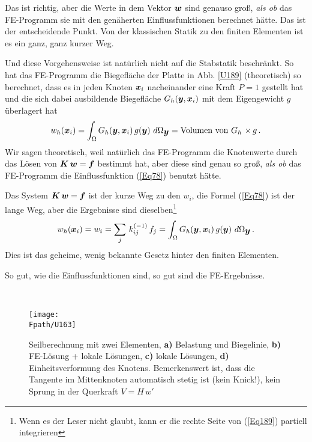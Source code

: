 Das ist richtig, aber die Werte in dem Vektor $\mbox{\boldmath $w$}$ sind genauso gro{\ss}, {\em als ob\/} das FE-Programm sie mit den gen\"{a}herten Einflussfunktionen berechnet h\"{a}tte. Das ist der entscheidende Punkt. Von der klassischen Statik zu den finiten Elementen ist es ein ganz, ganz kurzer Weg.

Und diese Vorgehensweise ist nat\"{u}rlich nicht auf die Stabstatik beschr\"{a}nkt. So hat das FE-Programm die Biegefl\"{a}che der Platte in Abb. \ref{U189} (theoretisch) so berechnet, dass es in jeden Knoten $\mbox{\boldmath $x$}_i$ nacheinander eine Kraft $P = 1$ gestellt hat und die sich dabei ausbildende Biegefl\"{a}che $G_h(\mbox{\boldmath $y$},\mbox{\boldmath $x$}_i)$ mit dem Eigengewicht $g$ \"{u}berlagert hat
\begin{align}\label{Eq78}
w_h(\mbox{\boldmath $x$}_i) = \int_{\Omega} G_h(\mbox{\boldmath $y$}, \mbox{\boldmath $x$}_i)\,g(\mbox{\boldmath $y$})\,\,d\Omega_{\mbox{\boldmath $y$}} = \text{Volumen von $G_h$ $\times\,g$}\,.
\end{align}
Wir sagen theoretisch, weil nat\"{u}rlich das FE-Programm die Knotenwerte durch das L\"{o}sen von $\mbox{\boldmath $K$}\,\mbox{\boldmath $w$} = \mbox{\boldmath $f$}$ bestimmt hat, aber diese sind  genau so gro{\ss}, {\em als ob\/} das FE-Programm die Einflussfunktion (\ref{Eq78}) benutzt h\"{a}tte.

Das System $\mbox{\boldmath $K$}\,\mbox{\boldmath $w$} = \mbox{\boldmath $f$}$ ist der \glq kurze\grq{} Weg zu den $w_i$, die Formel (\ref{Eq78}) ist der \glq lange\grq{} Weg, aber die Ergebnisse sind dieselben\footnote{Wenn es der Leser nicht glaubt, kann er die rechte Seite von (\ref{Eq189}) partiell integrieren}
\begin{align}\label{Eq189}
w_h(\mbox{\boldmath $x$}_i) = w_i = \sum_j\,k_{ij}^{(-1)}\,f_j = \int_{\Omega} G_h(\mbox{\boldmath $y$}, \mbox{\boldmath $x$}_i)\,g(\mbox{\boldmath $y$})\,\,d\Omega_{\mbox{\boldmath $y$}}\,.
\end{align}
Dies ist das geheime, wenig bekannte Gesetz hinter den finiten Elementen. \\

\hspace*{-12pt}\colorbox{highlightBlue}{\parbox{0.98\textwidth}{So gut, wie die Einflussfunktionen sind, so gut sind die FE-Ergebnisse.}}\\

\begin{figure}[tbp]
\centering
\if {} \sidecaption[t] \fi
\texttt{[image: \\Fpath/U163]}
\caption{Seilberechnung mit zwei Elementen,  \textbf{a)} Belastung und Biegelinie, \textbf{ b)} FE-L\"{o}sung + lokale L\"{o}sungen, \textbf{ c)} lokale L\"{o}sungen, \textbf{ d)} Einheitsverformung des Knotens. Bemerkenswert ist, dass die Tangente im Mittenknoten automatisch stetig ist (kein Knick!), kein Sprung in der Querkraft $V = H\,w'$} \label{U163}
\end{figure}%

